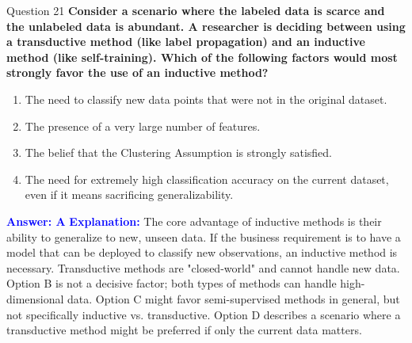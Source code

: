 \documentclass[8pt]{beamer}  %
\begin{document}
	\begin{frame}{Question 21}
		\textbf{Consider a scenario where the labeled data is scarce and the unlabeled data is abundant. A researcher is deciding between using a transductive method (like label propagation) and an inductive method (like self-training). Which of the following factors would most strongly favor the use of an inductive method?}
		\begin{enumerate}
			\item The need to classify new data points that were not in the original dataset.
			\item The presence of a very large number of features.
			\item The belief that the Clustering Assumption is strongly satisfied.
			\item The need for extremely high classification accuracy on the current dataset, even if it means sacrificing generalizability.
		\end{enumerate}
		\vspace{0.2cm}
		\textcolor{blue}{\textbf{Answer: A}}
		\vspace{0.2cm}
		\textcolor{blue}{\textbf{Explanation:}} The core advantage of inductive methods is their ability to generalize to new, unseen data. If the business requirement is to have a model that can be deployed to classify new observations, an inductive method is necessary. Transductive methods are "closed-world" and cannot handle new data. Option B is not a decisive factor; both types of methods can handle high-dimensional data. Option C might favor semi-supervised methods in general, but not specifically inductive vs. transductive. Option D describes a scenario where a transductive method might be preferred if only the current data matters.
	\end{frame}
	
\end{document}
